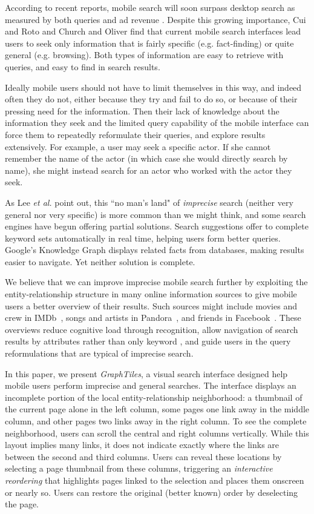 According to recent reports, mobile search will soon surpass desktop search as measured by both queries and ad revenue \cite{MobileQueries}\cite{MobileRevenue}. Despite this growing importance, Cui and Roto \cite{Cui:2008} and Church and Oliver \cite{Church:2011} find that current mobile search interfaces lead users to seek only information that is fairly specific (e.g. fact-finding) or quite general (e.g. browsing). Both types of information are easy to retrieve with queries, and easy to find in search results.

Ideally mobile users should not have to limit themselves in this way, and indeed often they do not, either because they try and fail to do so, or because of their pressing need for the information. Then their lack of knowledge about the information they seek and the limited query capability of the mobile interface \cite{Kamvar:2009} can force them to repeatedly reformulate their queries, and explore results extensively. For example, a user may seek a specific actor. If she cannot remember the name of the actor (in which case she would directly search by name), she might instead search for an actor who worked with the actor they seek.

As Lee \textit{et al.} \cite{Lee:2012} point out, this ``no man's land" of \textit{imprecise} search (neither very general nor very specific) is more common than we might think, and some search engines have begun offering partial solutions. Search suggestions offer to complete keyword sets automatically in real time, helping users form better queries. Google's Knowledge Graph \cite{GoogleKnowledgeGraph} displays related facts from databases, making results easier to navigate. Yet neither solution is complete.

We believe that we can improve imprecise mobile search further by exploiting the entity-relationship structure in many online information sources to give mobile users a better overview of their results. Such sources might include movies and crew in IMDb~\cite{imdb}, songs and artists in Pandora~\cite{pandora}, and friends in Facebook~\cite{Facebook}. These overviews reduce cognitive load through recognition, allow navigation of search results by attributes rather than only keyword \cite{Hearst:2002}, and guide users in the query reformulations that are typical of imprecise search.

In this paper, we present \textit{GraphTiles}, a visual search interface designed help mobile users perform imprecise and general searches. The interface displays an incomplete portion of the local entity-relationship neighborhood: a thumbnail of the current page alone in the left column, some pages one link away in the middle column, and other pages two links away in the right column. To see the complete neighborhood, users can scroll the central and right columns vertically. While this layout implies many links, it does not indicate exactly where the links are between the second and third columns. Users can reveal these locations by selecting a page thumbnail from these columns, triggering an \textit{interactive reordering} that highlights pages linked to the selection and places them onscreen or nearly so. Users can restore the original (better known) order by deselecting the page.